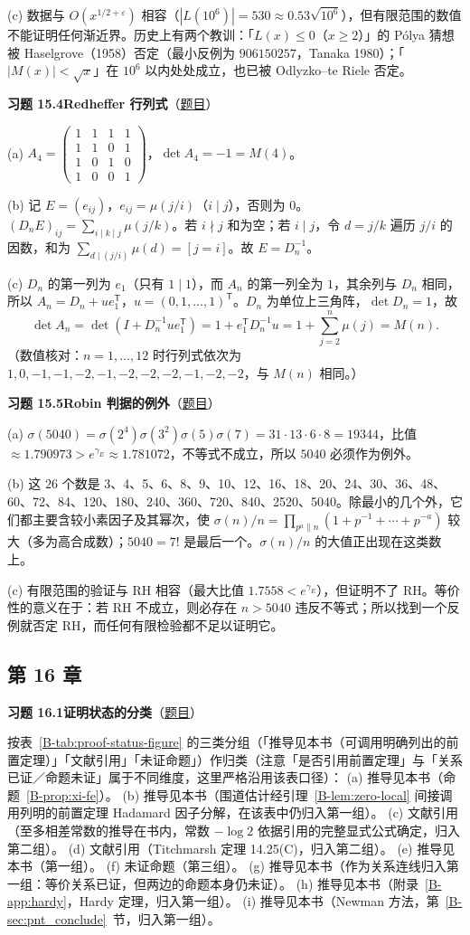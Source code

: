 \documentclass[11pt,a4paper]{article}
\newcommand{\bref}[1]{\ref*{B-#1}}
\newcommand{\Sol}[2]{%
  \par\addvspace{1.2em}\noindent
  \hypertarget{s:#1}{}\textbf{习题 #1\quad #2}\hfill{\small（\hyperlink{q:#1}{题目}）}\par
  \nopagebreak\smallskip}
\begin{document}
(c) 数据与 $O(x^{1/2+\varepsilon})$ 相容（$|L(10^6)|=530\approx0.53\sqrt{10^6}$），但有限范围的数值不能证明任何渐近界。历史上有两个教训：「$L(x)\le0$（$x\ge2$）」的 Pólya 猜想被 Haselgrove（1958）否定（最小反例为 $906150257$，Tanaka 1980）；「$|M(x)|<\sqrt x$」在 $10^6$ 以内处处成立，也已被 Odlyzko--te Riele 否定。

\Sol{15.4}{Redheffer 行列式}
(a) $A_4=\begin{pmatrix}1&1&1&1\\1&1&0&1\\1&0&1&0\\1&0&0&1\end{pmatrix}$，$\det A_4=-1=M(4)$。

(b) 记 $E=(e_{ij})$，$e_{ij}=\mu(j/i)$（$i\mid j$），否则为 $0$。$(D_nE)_{ij}=\sum_{i\mid k\mid j}\mu(j/k)$。若 $i\nmid j$ 和为空；若 $i\mid j$，令 $d=j/k$ 遍历 $j/i$ 的因数，和为 $\sum_{d\mid(j/i)}\mu(d)=[j=i]$。故 $E=D_n^{-1}$。

(c) $D_n$ 的第一列为 $e_1$（只有 $1\mid1$），而 $A_n$ 的第一列全为 $1$，其余列与 $D_n$ 相同，所以 $A_n=D_n+ue_1^{\mathsf T}$，$u=(0,1,\dots,1)^{\mathsf T}$。$D_n$ 为单位上三角阵，$\det D_n=1$，故
\[
  \det A_n=\det(I+D_n^{-1}ue_1^{\mathsf T})=1+e_1^{\mathsf T}D_n^{-1}u=1+\sum_{j=2}^n\mu(j)=M(n).
\]
（数值核对：$n=1,\dots,12$ 时行列式依次为 $1,0,-1,-1,-2,-1,-2,-2,-2,-1,-2,-2$，与 $M(n)$ 相同。）

\Sol{15.5}{Robin 判据的例外}
(a) $\sigma(5040)=\sigma(2^4)\sigma(3^2)\sigma(5)\sigma(7)=31\cdot13\cdot6\cdot8=19344$，比值 $\approx1.790973>e^{\gamma_E}\approx1.781072$，不等式不成立，所以 $5040$ 必须作为例外。

(b) 这 $26$ 个数是 3、4、5、6、8、9、10、12、16、18、20、24、30、36、48、60、72、84、120、180、240、360、720、840、2520、5040。除最小的几个外，它们都主要含较小素因子及其幂次，使 $\sigma(n)/n=\prod_{p^a\parallel n}(1+p^{-1}+\cdots+p^{-a})$ 较大（多为高合成数）；$5040=7!$ 是最后一个。$\sigma(n)/n$ 的大值正出现在这类数上。

(c) 有限范围的验证与 RH 相容（最大比值 $1.7558<e^{\gamma_E}$），但证明不了 RH。等价性的意义在于：若 RH 不成立，则必存在 $n>5040$ 违反不等式；所以找到一个反例就否定 RH，而任何有限检验都不足以证明它。

\subsection*{第 16 章}

\Sol{16.1}{证明状态的分类}
按表~\bref{tab:proof-status-figure} 的三类分组（「推导见本书（可调用明确列出的前置定理）」「文献引用」「未证命题」）作归类（注意「是否引用前置定理」与「关系已证／命题未证」属于不同维度，这里严格沿用该表口径）：
(a) 推导见本书（命题~\bref{prop:xi-fe}）。
(b) 推导见本书（围道估计经引理~\bref{lem:zero-local} 间接调用列明的前置定理 Hadamard 因子分解，在该表中仍归入第一组）。
(c) 文献引用（至多相差常数的推导在书内，常数 $-\log2$ 依据引用的完整显式公式确定，归入第二组）。
(d) 文献引用（Titchmarsh 定理 14.25(C)，归入第二组）。
(e) 推导见本书（第一组）。
(f) 未证命题（第三组）。
(g) 推导见本书（作为关系连线归入第一组：等价关系已证，但两边的命题本身仍未证）。
(h) 推导见本书（附录~\bref{app:hardy}，Hardy 定理，归入第一组）。
(i) 推导见本书（Newman 方法，第~\bref{sec:pnt_conclude}~节，归入第一组）。
\end{document}
